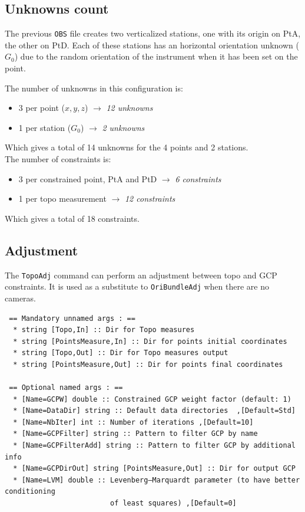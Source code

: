 \subsection{Unknowns count}

The previous \texttt{OBS} file creates two verticalized stations, one with its origin on PtA, the other on PtD.
Each of these stations has an horizontal orientation unknown ($G_0$) due to the random orientation of the instrument
when it has been set on the point.

The number of unknowns in this configuration is:
\begin{itemize}
   \item 3 per point ($x, y, z$)  $\rightarrow$ \textit{12 unknowns}
   \item 1 per station ($G_0$)  $\rightarrow$ \textit{2 unknowns}
\end{itemize}

Which gives a total of 14 unknowns for the 4 points and 2 stations.
\\

The number of constraints is:
\begin{itemize}
   \item 3 per constrained point, PtA and PtD  $\rightarrow$ \textit{6 constraints}
   \item 1 per topo measurement $\rightarrow$ \textit{12 constraints}
\end{itemize}

Which gives a total of 18 constraints.


\subsection{Adjustment}
\label{subsec:TopoAdj}
The \texttt{TopoAdj} command can perform an adjustment between topo and GCP constraints.
It is used as a substitute to \texttt{OriBundleAdj} when there are no cameras.

\begin{verbatim}
 == Mandatory unnamed args : ==
  * string [Topo,In] :: Dir for Topo measures
  * string [PointsMeasure,In] :: Dir for points initial coordinates
  * string [Topo,Out] :: Dir for Topo measures output
  * string [PointsMeasure,Out] :: Dir for points final coordinates

 == Optional named args : ==
  * [Name=GCPW] double :: Constrained GCP weight factor (default: 1)
  * [Name=DataDir] string :: Default data directories  ,[Default=Std]
  * [Name=NbIter] int :: Number of iterations ,[Default=10]
  * [Name=GCPFilter] string :: Pattern to filter GCP by name
  * [Name=GCPFilterAdd] string :: Pattern to filter GCP by additional info
  * [Name=GCPDirOut] string [PointsMeasure,Out] :: Dir for output GCP
  * [Name=LVM] double :: Levenberg–Marquardt parameter (to have better conditioning
                         of least squares) ,[Default=0]
\end{verbatim}

